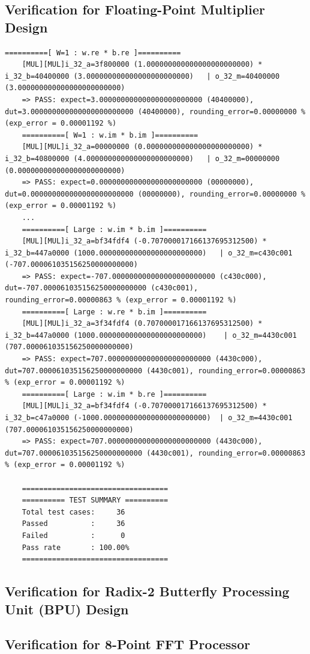 \subsection{Verification for Floating-Point Multiplier Design}

\begin{lstlisting}[style=StyleResult, basicstyle=\fontsize{6}{7}\selectfont\ttfamily ,language=Result, caption={Kết quả test của bộ nhân FPU.}]
	==========[ W=1 : w.re * b.re ]==========
	[MUL][MUL]i_32_a=3f800000 (1.000000000000000000000000) * i_32_b=40400000 (3.000000000000000000000000) 	| o_32_m=40400000 (3.000000000000000000000000)
	=> PASS: expect=3.000000000000000000000000 (40400000), dut=3.000000000000000000000000 (40400000), rounding_error=0.00000000 % (exp_error = 0.00001192 %)
	==========[ W=1 : w.im * b.im ]==========
	[MUL][MUL]i_32_a=00000000 (0.000000000000000000000000) * i_32_b=40800000 (4.000000000000000000000000) 	| o_32_m=00000000 (0.000000000000000000000000)
	=> PASS: expect=0.000000000000000000000000 (00000000), dut=0.000000000000000000000000 (00000000), rounding_error=0.00000000 % (exp_error = 0.00001192 %)
	...
	==========[ Large : w.im * b.im ]==========
	[MUL][MUL]i_32_a=bf34fdf4 (-0.707000017166137695312500) * i_32_b=447a0000 (1000.000000000000000000000000) 	| o_32_m=c430c001 (-707.000061035156250000000000)
	=> PASS: expect=-707.000000000000000000000000 (c430c000), dut=-707.000061035156250000000000 (c430c001), rounding_error=0.00000863 % (exp_error = 0.00001192 %)
	==========[ Large : w.re * b.im ]==========
	[MUL][MUL]i_32_a=3f34fdf4 (0.707000017166137695312500) * i_32_b=447a0000 (1000.000000000000000000000000) 	| o_32_m=4430c001 (707.000061035156250000000000)
	=> PASS: expect=707.000000000000000000000000 (4430c000), dut=707.000061035156250000000000 (4430c001), rounding_error=0.00000863 % (exp_error = 0.00001192 %)
	==========[ Large : w.im * b.re ]==========
	[MUL][MUL]i_32_a=bf34fdf4 (-0.707000017166137695312500) * i_32_b=c47a0000 (-1000.000000000000000000000000) 	| o_32_m=4430c001 (707.000061035156250000000000)
	=> PASS: expect=707.000000000000000000000000 (4430c000), dut=707.000061035156250000000000 (4430c001), rounding_error=0.00000863 % (exp_error = 0.00001192 %)
	
	==================================
	========== TEST SUMMARY ==========
	Total test cases:     36
	Passed          :     36
	Failed          :      0
	Pass rate       : 100.00%
	==================================
\end{lstlisting}

\subsection{Verification for Radix-2 Butterfly Processing Unit (BPU) Design}

\subsection{Verification for 8-Point FFT Processor}